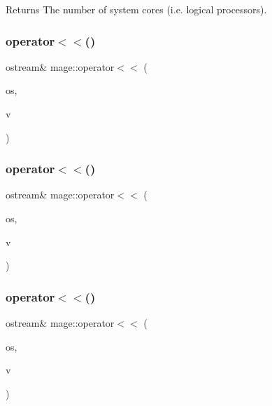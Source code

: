 \begin{DoxyReturn}{Returns}
The number of system cores (i.\+e. logical processors). 
\end{DoxyReturn}
\hypertarget{namespacemage_ac348ad49bf7e9912aa70cda1b0ca553d}{}\label{namespacemage_ac348ad49bf7e9912aa70cda1b0ca553d} 
\subsubsection{\texorpdfstring{operator$<$$<$()}{operator<<()}\hspace{0.1cm}{\footnotesize\ttfamily [1/3]}}
{\footnotesize\ttfamily ostream\& mage\+::operator$<$$<$ (\begin{DoxyParamCaption}\item[{ostream \&}]{os,  }\item[{const X\+M\+F\+L\+O\+A\+T2 \&}]{v }\end{DoxyParamCaption})}

\hypertarget{namespacemage_a44b2d3046802608544402245919f219b}{}\label{namespacemage_a44b2d3046802608544402245919f219b} 
\subsubsection{\texorpdfstring{operator$<$$<$()}{operator<<()}\hspace{0.1cm}{\footnotesize\ttfamily [2/3]}}
{\footnotesize\ttfamily ostream\& mage\+::operator$<$$<$ (\begin{DoxyParamCaption}\item[{ostream \&}]{os,  }\item[{const X\+M\+F\+L\+O\+A\+T3 \&}]{v }\end{DoxyParamCaption})}

\hypertarget{namespacemage_af6c1d1c5718d611450932bde30d2bfef}{}\label{namespacemage_af6c1d1c5718d611450932bde30d2bfef} 
\subsubsection{\texorpdfstring{operator$<$$<$()}{operator<<()}\hspace{0.1cm}{\footnotesize\ttfamily [3/3]}}
{\footnotesize\ttfamily ostream\& mage\+::operator$<$$<$ (\begin{DoxyParamCaption}\item[{ostream \&}]{os,  }\item[{const X\+M\+F\+L\+O\+A\+T4 \&}]{v }\end{DoxyParamCaption})}

